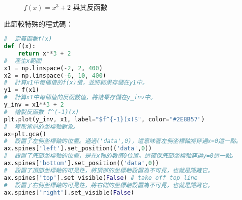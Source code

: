 \documentclass[12pt, a4paper]{article}
\begin{document}
\begin{figure}[H]
    \caption{$f(x)=x^3+2 $ 與其反函數}
    \label{fig:inf}
\end{figure}
此節較特殊的程式碼：
\begin{lstlisting}[language=Python]
#  定義函數f(x)
def f(x):
    return x**3 + 2
#  產生x範圍
x1 = np.linspace(-2, 2, 400)
x2 = np.linspace(-6, 10, 400)
#  計算x1中每個值的f(x)值，並將結果存儲在y1中。
y1 = f(x1)
#  計算x1中每個值的反函數值，將結果存儲在y_inv中。
y_inv = x1**3 + 2
#  繪製反函數 f^(-1)(x)
plt.plot(y_inv, x1, label="$f^{-1}(x)$", color="#2E8B57")
#  獲取當前的坐標軸對象。
ax=plt.gca()
#  設置了左側坐標軸的位置。通過('data',0)，這意味著左側坐標軸將穿過x=0這一點。
ax.spines['left'].set_position(('data',0))
#  設置了底部坐標軸的位置，是在x軸的數值0位置。這確保底部坐標軸穿過y=0這一點。
ax.spines['bottom'].set_position(('data',0))
#  設置了頂部坐標軸的可見性，將頂部的坐標軸設置為不可見，也就是隱藏它。
ax.spines['top'].set_visible(False) # take off top line
#  設置了右側坐標軸的可見性，將右側的坐標軸設置為不可見，也就是隱藏它。
ax.spines['right'].set_visible(False)
\end{lstlisting}
\end{document}
